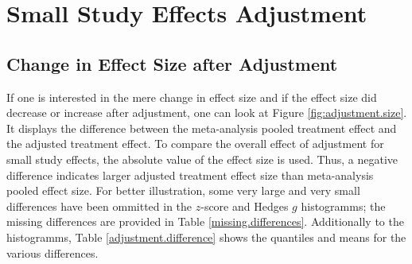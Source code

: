 \documentclass[11pt,a4paper,twoside]{book}\usepackage[]{graphicx}\usepackage[]{color}
\begin{document}

\section{Small Study Effects Adjustment}


\subsection{Change in Effect Size after Adjustment}

If one is interested in the mere change in effect size and if the effect size did decrease or increase after adjustment, one can look at Figure \ref{fig:adjustment.size}. It displays the difference between the meta-analysis pooled treatment effect and the adjusted treatment effect. To compare the overall effect of adjustment for small study effects, the absolute value of the effect size is used. Thus, a negative difference indicates larger adjusted treatment effect size than meta-analysis pooled effect size. For better illustration, some very large and very small differences have been ommitted in the $z$-score and Hedges $g$ histogramms; the missing differences are provided in Table \ref{missing.differences}. Additionally to the histogramms, Table \ref{adjustment.difference} shows the quantiles and means for the various differences.
\end{document}
